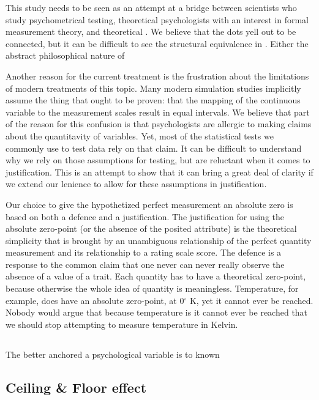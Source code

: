 \documentclass[utf8]{FrontiersinVancouver}
\begin{document}
This study needs to be seen as an attempt at a bridge between scientists who study psychometrical testing, theoretical psychologists with an interest in formal measurement theory, and theoretical . We believe that the dots yell out to be connected, but it can be difficult to see the structural equivalence in . Either the abstract philosophical nature of  


Another reason for the current treatment is the frustration about the limitations of modern treatments of this topic. Many modern simulation studies implicitly assume the thing that ought to be proven: that the mapping of the continuous variable to the measurement scales result in equal intervals. We believe that part of the reason for this confusion is that psychologists are allergic to making claims about the quantitavity of variables. Yet, most of the statistical tests we commonly use to test data rely on that claim. It can be difficult to understand why we rely on those assumptions for testing, but are reluctant when it comes to justification. This is an attempt to show that it can bring a great deal of clarity if we extend our lenience to allow for these assumptions in justification.

Our choice to give the hypothetized perfect measurement an absolute zero is based on both a defence and a justification. The justification for using the absolute zero-point (or the absence of the posited attribute) is the theoretical simplicity that is brought by an unambiguous relationship of the perfect quantity measurement and its relationship to a rating scale score. The defence is a response to the common claim that one never can never really observe the absence of a value of a trait. Each quantity has to have a theoretical zero-point, because otherwise the whole idea of quantity is meaningless. Temperature, for example, does have an absolute zero-point, at 0$^\circ$ K, yet it cannot ever be reached. Nobody would argue that because temperature is  it cannot ever be reached that we should stop attempting to measure temperature in Kelvin. 

\subsection{}
The better anchored a psychological variable is to known 

\subsection{Ceiling & Floor effect}
\end{document}
